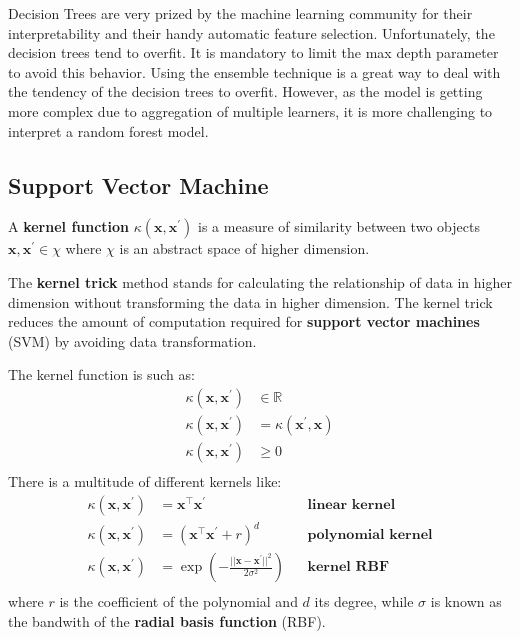 \documentclass[12pt]{report}
\begin{document}
            Decision Trees are very prized by the machine learning community for their interpretability and their handy automatic feature selection. Unfortunately, the decision trees tend to overfit. It is mandatory to limit the max depth parameter to avoid this behavior. Using the ensemble technique is a great way to deal with the tendency of the decision trees to overfit. However, as the model is getting more complex due to aggregation of multiple learners, it is more challenging to interpret a random forest model.
            
    \subsection{Support Vector Machine}
        A \textbf{kernel function} $\kappa(\boldsymbol{x}, \boldsymbol{x^{'}})$ is a measure of similarity between two objects $\boldsymbol{x}, \boldsymbol{x^{'}} \in \chi$ where $\chi$ is an abstract space of higher dimension. 
        
        The \textbf{kernel trick} method stands for calculating the relationship of data in higher dimension without transforming the data in higher dimension. The kernel trick reduces the amount of computation required for \textbf{support vector machines} (SVM) by avoiding data transformation.
        
        The kernel function is such as:
        \begin{align}
            \kappa(\boldsymbol{x}, \boldsymbol{x^{'}}) &\in \mathbb{R} \\
            \kappa(\boldsymbol{x}, \boldsymbol{x}^{'}) &= \kappa(\boldsymbol{x}^{'}, \boldsymbol{x}) \\
            \kappa(\boldsymbol{x}, \boldsymbol{x^{'}}) &\geq 0 \\
        \end{align}
        There is a multitude of different kernels like:
        \begin{align}
            \kappa(\boldsymbol{x}, \boldsymbol{x^{'}}) &= \boldsymbol{x}^\top \boldsymbol{x}^{'} && \textbf{linear kernel} \\
            \kappa(\boldsymbol{x}, \boldsymbol{x^{'}}) &= \left(\boldsymbol{x}^\top \boldsymbol{x^{'}} + r\right)^d && \textbf{polynomial kernel} \\
            \kappa(\boldsymbol{x}, \boldsymbol{x^{'}}) &= \exp\left(-\frac{|| \boldsymbol{x} -  \boldsymbol{x^{'}} ||^2}{2\sigma^{2}}\right) && \textbf{kernel RBF} \\
        \end{align}
        where $r$ is the coefficient of the polynomial and $d$ its degree, while $\sigma$ is known as the bandwith of the \textbf{radial basis function} (RBF).
        
\end{document}
